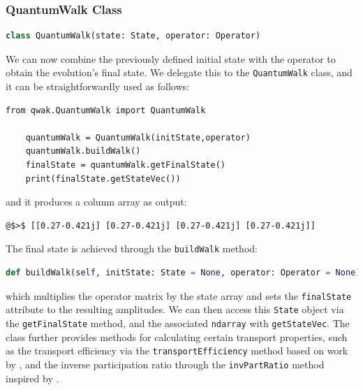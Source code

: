 \documentclass[../../dissertation.tex]{subfiles}
\begin{document}
\subsubsection{QuantumWalk Class}

\begin{lstlisting}[style=commands,language=Python,mathescape]
    class QuantumWalk(state: State, operator: Operator)
\end{lstlisting}
We can now combine the previously defined initial state with the operator 
to obtain the evolution's final state. We delegate this to the
\texttt{QuantumWalk} class, and it can be straightforwardly used as follows:
\begin{lstlisting}[style=code,escapeinside={__}]
    from qwak.QuantumWalk import QuantumWalk 

    quantumWalk = QuantumWalk(initState,operator)
    quantumWalk.buildWalk()
    finalState = quantumWalk.getFinalState()
    print(finalState.getStateVec())
\end{lstlisting}
and it produces a column array as output:
\begin{lstlisting}[style=commands,mathescape]
@$>$ [[0.27-0.421j] [0.27-0.421j] [0.27-0.421j] [0.27-0.421j]]
\end{lstlisting}\par

The final state is achieved through the \texttt{buildWalk} method: 
\begin{lstlisting}[style=commands,mathescape,language=Python]
    def buildWalk(self, initState: State = None, operator: Operator = None)
\end{lstlisting}
which multiplies the operator matrix by the state array and sets the
\texttt{finalState} attribute to the resulting amplitudes. We can then access
this \texttt{State} object via the \texttt{getFinalState} method, and the
associated \texttt{ndarray} with \texttt{getStateVec}. The class further
provides methods for calculating certain transport properties, such as the
transport efficiency via the \texttt{transportEfficiency} method based on work
by \cite{razzoli21}, and the inverse participation ratio through the
\texttt{invPartRatio} method inspired by \cite{buarqueAperiodic19}. 
\end{document}
